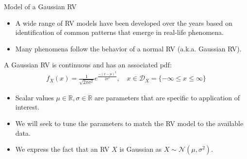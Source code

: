 \documentclass[9pt]{beamer}
\begin{document}
%
\begin{frame}{Model of a Gaussian RV}

\begin{itemize}
\setlength{\itemsep}{10pt}
\item A wide range of RV models have been developed over the years based on identification of common patterns that emerge in real-life phenomena. 

\item Many phenomena follow the behavior of a normal RV (a.k.a. Gaussian RV). 

\end{itemize}

\begin{block}{}
A Gaussian RV is continuous and has an associated pdf:
\begin{align*}
f_X(x)=\frac{1}{\sqrt{2\pi\sigma^2}}e^{\frac{-(x-\mu)^2}{2\sigma^2}}, \quad  x\in \mathcal{D}_X=\{-\infty\leq x\leq \infty\}
\end{align*}
\end{block}
\begin{itemize}
\setlength{\itemsep}{10pt}
\item Scalar values $\mu\in \mathbb{R},\sigma\in \mathbb{R}$ are parameters that are specific to application of interest.

\item We will seek to tune the parameters to match the RV model to the available data. 

\item We express the fact that an RV $X$ is Gaussian as $X\sim \mathcal{N}(\mu,\sigma^2)$. 

\end{itemize}

\end{frame}
\end{document}
